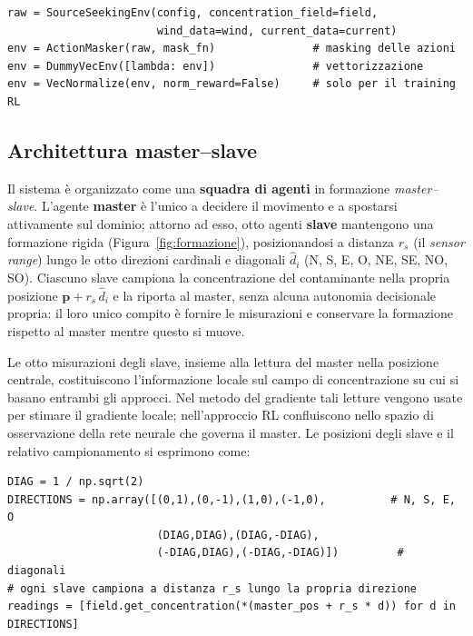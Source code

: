 \begin{lstlisting}
raw = SourceSeekingEnv(config, concentration_field=field,
                       wind_data=wind, current_data=current)
env = ActionMasker(raw, mask_fn)               # masking delle azioni
env = DummyVecEnv([lambda: env])               # vettorizzazione
env = VecNormalize(env, norm_reward=False)     # solo per il training RL
\end{lstlisting}

\subsection{Architettura master--slave}
\label{sec:master_slave}

Il sistema \`e organizzato come una \textbf{squadra di agenti} in formazione
\emph{master--slave}. L'agente \textbf{master} \`e l'unico a decidere il movimento e a
spostarsi attivamente sul dominio; attorno ad esso, otto agenti \textbf{slave}
mantengono una formazione rigida (Figura~\ref{fig:formazione}), posizionandosi a distanza
$r_s$ (il \emph{sensor range}) lungo le otto direzioni cardinali e diagonali $\hat{d}_i$ (N, S, E, O, NE, SE,
NO, SO). Ciascuno slave campiona la concentrazione del contaminante nella propria
posizione $\mathbf{p} + r_s\,\hat{d}_i$ e la riporta al master, senza alcuna autonomia
decisionale propria: il loro unico compito \`e fornire le misurazioni e conservare la
formazione rispetto al master mentre questo si muove.

Le otto misurazioni degli slave, insieme alla lettura del master nella posizione
centrale, costituiscono l'informazione locale sul campo di concentrazione su cui si
basano entrambi gli approcci. Nel metodo del gradiente tali letture vengono usate per
stimare il gradiente locale; nell'approccio RL confluiscono nello spazio di osservazione
della rete neurale che governa il master. Le posizioni degli slave e il relativo
campionamento si esprimono come:

\begin{lstlisting}
DIAG = 1 / np.sqrt(2)
DIRECTIONS = np.array([(0,1),(0,-1),(1,0),(-1,0),          # N, S, E, O
                       (DIAG,DIAG),(DIAG,-DIAG),
                       (-DIAG,DIAG),(-DIAG,-DIAG)])         # diagonali
# ogni slave campiona a distanza r_s lungo la propria direzione
readings = [field.get_concentration(*(master_pos + r_s * d)) for d in DIRECTIONS]
\end{lstlisting}


